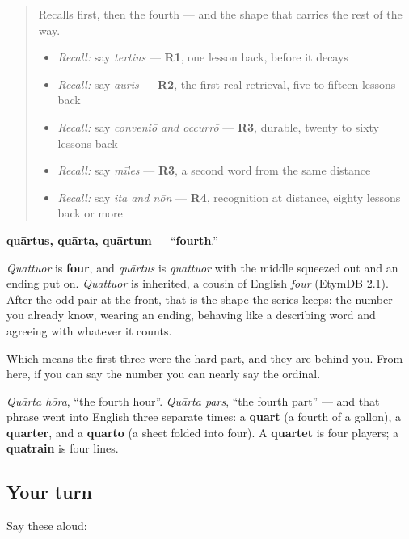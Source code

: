 \label{lesson:LA-C55-quartus}



\begin{quote}
Recalls first, then the fourth — and the shape that carries the rest of the way.

\begin{itemize}
\raggedright
  \item \emph{Recall:} say \emph{tertius} — \textbf{R1}, one lesson back, before it decays
  \item \emph{Recall:} say \emph{auris} — \textbf{R2}, the first real retrieval, five to fifteen lessons back
  \item \emph{Recall:} say \emph{conveniō and occurrō} — \textbf{R3}, durable, twenty to sixty lessons back
  \item \emph{Recall:} say \emph{mīles} — \textbf{R3}, a second word from the same distance
  \item \emph{Recall:} say \emph{ita and nōn} — \textbf{R4}, recognition at distance, eighty lessons back or more
\end{itemize}
\end{quote}

\begin{cousinweb}
\textbf{quārtus, quārta, quārtum} — \textquotedblleft{}\textbf{fourth}.\textquotedblright{}

\emph{Quattuor} is \textbf{four}, and \emph{quārtus} is \emph{quattuor} with the middle squeezed out and an ending put on. \emph{Quattuor} is inherited, a cousin of English \emph{four} (EtymDB 2.1). After the odd pair at the front, that is the shape the series keeps: the number you already know, wearing an ending, behaving like a describing word and agreeing with whatever it counts.

Which means the first three were the hard part, and they are behind you. From here, if you can say the number you can nearly say the ordinal.

\emph{Quārta hōra}, \textquotedblleft{}the fourth hour\textquotedblright{}. \emph{Quārta pars}, \textquotedblleft{}the fourth part\textquotedblright{} — and that phrase went into English three separate times: a \textbf{quart} (a fourth of a gallon), a \textbf{quarter}, and a \textbf{quarto} (a sheet folded into four). A \textbf{quartet} is four players; a \textbf{quatrain} is four lines.
\end{cousinweb}

\subsection*{Your turn}
Say these aloud:

